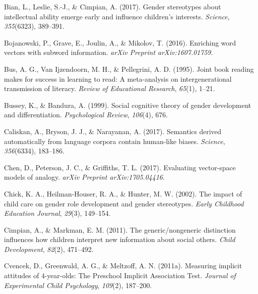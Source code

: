 \documentclass[
  english,
  ,man,floatsintext]{apa6}
\begin{document}
\setlength{\parindent}{-0.5in}
\setlength{\leftskip}{0.5in}

\hypertarget{refs}{}
\leavevmode\hypertarget{ref-bian2017gender}{}%
Bian, L., Leslie, S.-J., \& Cimpian, A. (2017). Gender stereotypes about intellectual ability emerge early and influence children's interests. \emph{Science}, \emph{355}(6323), 389--391.

\leavevmode\hypertarget{ref-bojanowski2016enriching}{}%
Bojanowski, P., Grave, E., Joulin, A., \& Mikolov, T. (2016). Enriching word vectors with subword information. \emph{arXiv Preprint arXiv:1607.01759}.

\leavevmode\hypertarget{ref-bus1995joint}{}%
Bus, A. G., Van Ijzendoorn, M. H., \& Pellegrini, A. D. (1995). Joint book reading makes for success in learning to read: A meta-analysis on intergenerational transmission of literacy. \emph{Review of Educational Research}, \emph{65}(1), 1--21.

\leavevmode\hypertarget{ref-bussey1999social}{}%
Bussey, K., \& Bandura, A. (1999). Social cognitive theory of gender development and differentiation. \emph{Psychological Review}, \emph{106}(4), 676.

\leavevmode\hypertarget{ref-caliskan2017semantics}{}%
Caliskan, A., Bryson, J. J., \& Narayanan, A. (2017). Semantics derived automatically from language corpora contain human-like biases. \emph{Science}, \emph{356}(6334), 183--186.

\leavevmode\hypertarget{ref-chen2017evaluating}{}%
Chen, D., Peterson, J. C., \& Griffiths, T. L. (2017). Evaluating vector-space models of analogy. \emph{arXiv Preprint arXiv:1705.04416}.

\leavevmode\hypertarget{ref-chick2002impact}{}%
Chick, K. A., Heilman-Houser, R. A., \& Hunter, M. W. (2002). The impact of child care on gender role development and gender stereotypes. \emph{Early Childhood Education Journal}, \emph{29}(3), 149--154.

\leavevmode\hypertarget{ref-cimpian2011generic}{}%
Cimpian, A., \& Markman, E. M. (2011). The generic/nongeneric distinction influences how children interpret new information about social others. \emph{Child Development}, \emph{82}(2), 471--492.

\leavevmode\hypertarget{ref-cvencek2011measuring}{}%
Cvencek, D., Greenwald, A. G., \& Meltzoff, A. N. (2011a). Measuring implicit attitudes of 4-year-olds: The Preschool Implicit Association Test. \emph{Journal of Experimental Child Psychology}, \emph{109}(2), 187--200.
\end{document}
